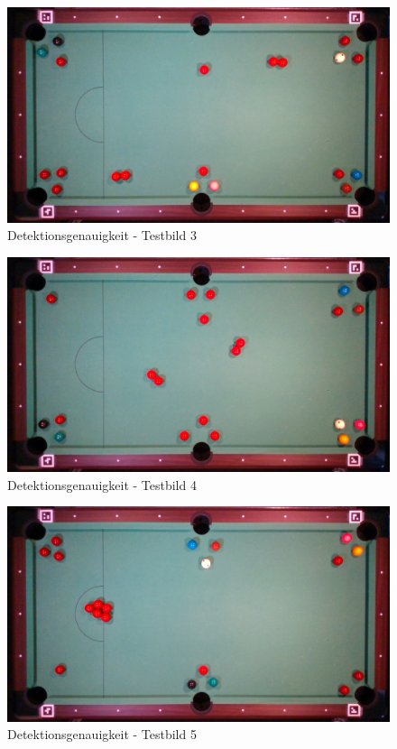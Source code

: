 \begin{figure}[h!]
    \begin{center}
        \includegraphics[width=0.8\linewidth]{../common/07_appendix/resources/00_detection/02_detektion_testbild_3.png}
    \end{center}
    \caption{Detektionsgenauigkeit - Testbild 3}
    \label{fig:detektionsgenauigkeit:testbild:3}
\end{figure}
\begin{figure}[h!]
    \begin{center}
        \includegraphics[width=0.8\linewidth]{../common/07_appendix/resources/00_detection/03_detektion_testbild_4.png}
    \end{center}
    \caption{Detektionsgenauigkeit - Testbild 4}
    \label{fig:detektionsgenauigkeit:testbild:4}
\end{figure}
\begin{figure}[h!]
    \begin{center}
        \includegraphics[width=0.8\linewidth]{../common/07_appendix/resources/00_detection/04_detektion_testbild_5.png}
    \end{center}
    \caption{Detektionsgenauigkeit - Testbild 5}
    \label{fig:detektionsgenauigkeit:testbild:5}
\end{figure}
